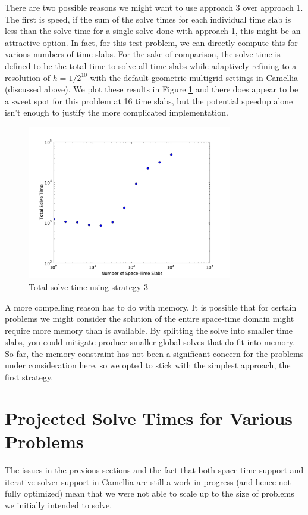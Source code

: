 \documentclass[Dissertation.tex]{subfiles}
\begin{document}
There are two possible reasons we might want to use approach 3 over approach 1.
The first is speed, if the sum of the solve times for each individual time slab is
less than the solve time for a single solve done with approach 1, this might be an
attractive option. In fact, for this test problem, we can directly compute this for
various numbers of time slabs. 
For the sake of comparison, the solve time is defined to be the total time to solve all
time slabs while adaptively refining to a resolution of $h=1/2^{10}$ 
with the default geometric multigrid settings in Camellia (discussed above).
We plot these results in Figure \ref{fig:TimeSlabSolveTime} and there does appear to be 
a sweet spot for this problem at 16 time slabs, but the potential speedup alone isn't 
enough to justify the more complicated implementation.
\begin{figure}
\centering
\includegraphics[width=0.8\textwidth]{Dissertation/Scaling/TimeSlabSolveTime.pdf}
\caption{Total solve time using strategy 3}
\label{fig:TimeSlabSolveTime}
\end{figure}

A more compelling reason has to do with memory. It is possible that for certain problems we might consider
the solution of the entire space-time domain might require more memory than is available.
By splitting the solve into smaller time slabs, you could mitigate produce smaller global solves that do 
fit into memory. So far, the memory constraint has not been a significant concern for the problems under
consideration here, so we opted to stick with the simplest approach, the first strategy.

\section{Projected Solve Times for Various Problems}
The issues in the previous sections and the fact that both space-time support and iterative solver support
in Camellia are still a work in progress (and hence not fully optimized) mean that we were not able to scale up to the size of problems we initially intended to solve.
\end{document}
